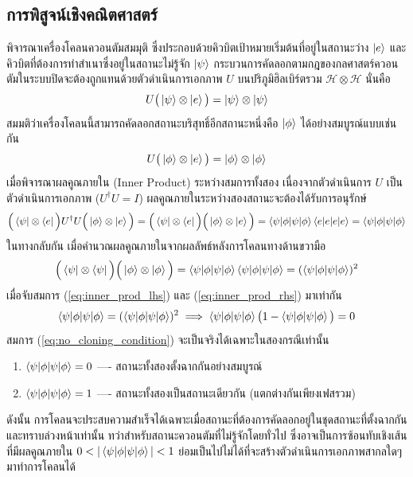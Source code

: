 \subsection{การพิสูจน์เชิงคณิตศาสตร์}
พิจารณาเครื่องโคลนควอนตัมสมมุติ ซึ่งประกอบด้วยคิวบิตเป้าหมายเริ่มต้นที่อยู่ในสถานะว่าง $\ket{e}$ และคิวบิตที่ต้องการทำสำเนาซึ่งอยู่ในสถานะไม่รู้จัก $\ket{\psi}$ กระบวนการคัดลอกตามกฎของกลศาสตร์ควอนตัมในระบบปิดจะต้องถูกแทนด้วยตัวดำเนินการเอกภาพ $U$ บนปริภูมิฮิลเบิร์ตรวม $\mathcal{H} \otimes \mathcal{H}$ นั่นคือ
\begin{equation}
U \big( \ket{\psi} \otimes \ket{e} \big) = \ket{\psi} \otimes \ket{\psi}
\label{eq:clone_psi}
\end{equation}
สมมติว่าเครื่องโคลนนี้สามารถคัดลอกสถานะบริสุทธิ์อีกสถานะหนึ่งคือ $\ket{\phi}$ ได้อย่างสมบูรณ์แบบเช่นกัน
\begin{equation}
U \big( \ket{\phi} \otimes \ket{e} \big) = \ket{\phi} \otimes \ket{\phi}
\label{eq:clone_phi}
\end{equation}
เมื่อพิจารณาผลคูณภายใน (Inner Product) ระหว่างสมการทั้งสอง เนื่องจากตัวดำเนินการ $U$ เป็นตัวดำเนินการเอกภาพ ($U^\dagger U = I$) ผลคูณภายในระหว่างสองสถานะจะต้องได้รับการอนุรักษ์
\begin{equation}
\Big( \bra{\psi} \otimes \bra{e} \Big) U^\dagger U \Big( \ket{\phi} \otimes \ket{e} \Big) = \Big( \bra{\psi} \otimes \bra{e} \Big) \Big( \ket{\phi} \otimes \ket{e} \Big) = \braket{\psi|\phi} \braket{e|e} = \braket{\psi|\phi}
\label{eq:inner_prod_lhs}
\end{equation}
ในทางกลับกัน เมื่อคำนวณผลคูณภายในจากผลลัพธ์หลังการโคลนทางด้านขวามือ
\begin{equation}
\Big( \bra{\psi} \otimes \bra{\psi} \Big) \Big( \ket{\phi} \otimes \ket{\phi} \Big) = \braket{\psi|\phi} \braket{\psi|\phi} = (\braket{\psi|\phi})^2
\label{eq:inner_prod_rhs}
\end{equation}
เมื่อจับสมการ (\ref{eq:inner_prod_lhs}) และ (\ref{eq:inner_prod_rhs}) มาเท่ากัน
\begin{equation}
\braket{\psi|\phi} = (\braket{\psi|\phi})^2 \implies \braket{\psi|\phi} \big( 1 - \braket{\psi|\phi} \big) = 0
\label{eq:no_cloning_condition}
\end{equation}
สมการ (\ref{eq:no_cloning_condition}) จะเป็นจริงได้เฉพาะในสองกรณีเท่านั้น
\begin{enumerate}
    \item $\braket{\psi|\phi} = 0$ ---- สถานะทั้งสองตั้งฉากกันอย่างสมบูรณ์
    \item $\braket{\psi|\phi} = 1$ ---- สถานะทั้งสองเป็นสถานะเดียวกัน (แตกต่างกันเพียงเฟสรวม)
\end{enumerate}
ดังนั้น การโคลนจะประสบความสำเร็จได้เฉพาะเมื่อสถานะที่ต้องการคัดลอกอยู่ในชุดสถานะที่ตั้งฉากกันและทราบล่วงหน้าเท่านั้น ทว่าสำหรับสถานะควอนตัมที่ไม่รู้จักโดยทั่วไป ซึ่งอาจเป็นการซ้อนทับเชิงเส้นที่มีผลคูณภายใน $0 < |\braket{\psi|\phi}| < 1$ ย่อมเป็นไปไม่ได้ที่จะสร้างตัวดำเนินการเอกภาพสากลใดๆ มาทำการโคลนได้

